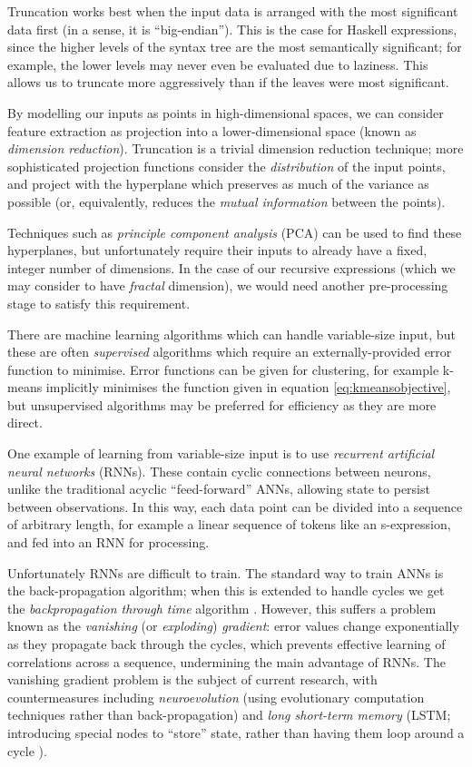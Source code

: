 Truncation works best when the input data is arranged with the most significant data first (in a sense, it is ``big-endian''). This is the case for Haskell expressions, since the higher levels of the syntax tree are the most semantically significant; for example, the lower levels may never even be evaluated due to laziness. This allows us to truncate more aggressively than if the leaves were most significant.

By modelling our inputs as points in high-dimensional spaces, we can consider feature extraction as projection into a lower-dimensional space (known as \emph{dimension reduction}). Truncation is a trivial dimension reduction technique; more sophisticated projection functions consider the \emph{distribution} of the input points, and project with the hyperplane which preserves as much of the variance as possible (or, equivalently, reduces the \emph{mutual information} between the points).

Techniques such as \emph{principle component analysis} (PCA) can be used to find these hyperplanes, but unfortunately require their inputs to already have a fixed, integer number of dimensions. In the case of our recursive expressions (which we may consider to have \emph{fractal} dimension), we would need another pre-processing stage to satisfy this requirement.

There are machine learning algorithms which can handle variable-size input, but these are often \emph{supervised} algorithms which require an externally-provided error function to minimise. Error functions can be given for clustering, for example k-means implicitly minimises the function given in equation \ref{eq:kmeansobjective}, but unsupervised algorithms may be preferred for efficiency as they are more direct.

One example of learning from variable-size input is to use \emph{recurrent artificial neural networks} (RNNs). These contain cyclic connections between neurons, unlike the traditional acyclic ``feed-forward'' ANNs, allowing state to persist between observations. In this way, each data point can be divided into a sequence of arbitrary length, for example a linear sequence of tokens like an s-expression, and fed into an RNN for processing.

Unfortunately RNNs are difficult to train. The standard way to train ANNs is the back-propagation algorithm; when this is extended to handle cycles we get the \emph{backpropagation through time} algorithm \citep{werbos1990backpropagation}. However, this suffers a problem known as the \emph{vanishing} (or \emph{exploding}) \emph{gradient}: error values change exponentially as they propagate back through the cycles, which prevents effective learning of correlations across a sequence, undermining the main advantage of RNNs. The vanishing gradient problem is the subject of current research, with countermeasures including \emph{neuroevolution} (using evolutionary computation techniques rather than back-propagation) and \emph{long short-term memory} (LSTM; introducing special nodes to ``store'' state, rather than having them loop around a cycle \citep{hochreiter1997long}).

